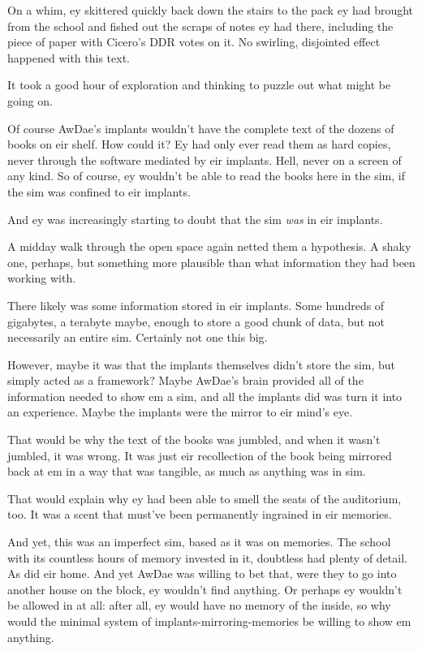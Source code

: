 On a whim, ey skittered quickly back down the stairs to the pack ey had brought from the school and fished out the scraps of notes ey had there, including the piece of paper with Cicero's DDR votes on it. No swirling, disjointed effect happened with this text.

It took a good hour of exploration and thinking to puzzle out what might be going on.

Of course AwDae's implants wouldn't have the complete text of the dozens of books on eir shelf. How could it? Ey had only ever read them as hard copies, never through the software mediated by eir implants. Hell, never on a screen of any kind. So of course, ey wouldn't be able to read the books here in the sim, if the sim was confined to eir implants.

And ey was increasingly starting to doubt that the sim \emph{was} in eir implants.

A midday walk through the open space again netted them a hypothesis. A shaky one, perhaps, but something more plausible than what information they had been working with.

There likely was some information stored in eir implants. Some hundreds of gigabytes, a terabyte maybe, enough to store a good chunk of data, but not necessarily an entire sim. Certainly not one this big.

However, maybe it was that the implants themselves didn't store the sim, but simply acted as a framework? Maybe AwDae's brain provided all of the information needed to show em a sim, and all the implants did was turn it into an experience. Maybe the implants were the mirror to eir mind's eye.

That would be why the text of the books was jumbled, and when it wasn't jumbled, it was wrong. It was just eir recollection of the book being mirrored back at em in a way that was tangible, as much as anything was in sim.

That would explain why ey had been able to smell the seats of the auditorium, too. It was a scent that must've been permanently ingrained in eir memories.

And yet, this was an imperfect sim, based as it was on memories. The school with its countless hours of memory invested in it, doubtless had plenty of detail. As did eir home. And yet AwDae was willing to bet that, were they to go into another house on the block, ey wouldn't find anything. Or perhaps ey wouldn't be allowed in at all: after all, ey would have no memory of the inside, so why would the minimal system of implants-mirroring-memories be willing to show em anything.

